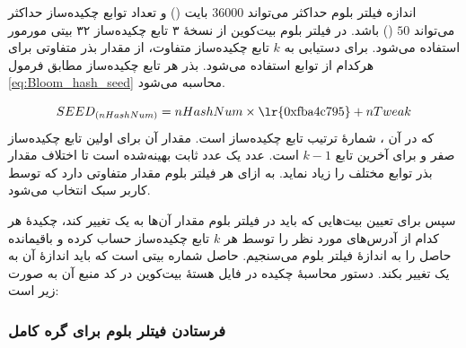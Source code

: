 
اندازه فیلتر بلوم حداکثر می‌تواند $36000$ بایت () و تعداد توابع چکیده‌ساز حداکثر می‌تواند $50$ () باشد. در فیلتر بلوم بیت‌کوین از نسخهٔ ۳ تابع چکیده‌ساز ۳۲ بیتی 
مورمور 
استفاده می‌شود\cite{Hearn2013}. برای دستیابی به $k$ تابع چکیده‌ساز متفاوت، از مقدار 
بذر 
متفاوتی برای هرکدام از توابع استفاده می‌شود. بذر هر تابع چکیده‌ساز مطابق فرمول \eqref{eq:Bloom_hash_seed} محاسبه می‌شود.

\begin{equation}
\label{eq:Bloom_hash_seed}
SEED_{(nHashNum)} = nHashNum \times \text{\lr{0xfba4c795}} + nTweak
\end{equation}
که در آن ، شمارهٔ ترتیب تابع چکیده‌ساز است. مقدار آن برای اولین تابع چکیده‌ساز صفر و برای آخرین تابع $k-1$ است. عدد  یک عدد ثابت بهینه‌شده است تا اختلاف مقدار بذر توابع مختلف را زیاد نماید.  به ازای هر فیلتر بلوم مقدار متفاوتی دارد که توسط کاربر سبک انتخاب می‌شود. 

سپس برای تعیین بیت‌هایی که باید در فیلتر بلوم مقدار آن‌ها به یک تغییر کند، چکیدهٔ هر کدام از آدرس‌های مورد نظر را توسط هر $k$ تابع چکیده‌ساز حساب کرده و باقیمانده‌ حاصل را به اندازهٔ فیلتر بلوم می‌سنجیم. حاصل شماره بیتی است که باید اندازه‌ٔ آن به یک تغییر بکند. دستور محاسبهٔ چکیده در فایل  هسته‌ٔ بیت‌کوین در کد منبع آن \cite{Bitcoincore.org}به صورت زیر است:





\subsubsection{فرستادن فیتلر بلوم برای گره کامل}

